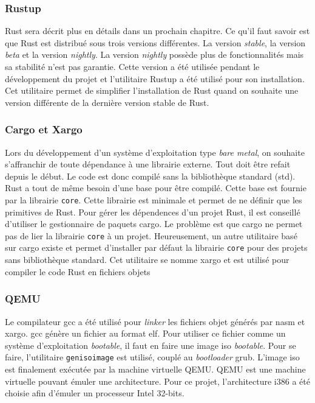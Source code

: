 \documentclass[a4paper, 12pt]{article}
\begin{document}
\subsubsection{Rustup}
Rust sera décrit plus en détails dans un prochain chapitre. Ce qu'il faut savoir
est que Rust est distribué sous trois versions différentes. La version \textit{stable},
la version \textit{beta} et la version \textit{nightly}. La version \textit{nightly}
possède plus de fonctionnalités mais sa stabilité n'est pas garantie. Cette version
a été utilisée pendant le développement du projet et l'utilitaire Rustup a été utilisé
pour son installation. Cet utilitaire permet de simplifier l'installation de Rust
quand on souhaite une version différente de la dernière version stable de Rust. \\

\subsubsection{Cargo et Xargo}
Lors du développement d'un système d'exploitation type \textit{bare metal}, on souhaite
s'affranchir de toute dépendance à une librairie externe. Tout doit être refait depuis
le début. Le code est donc compilé sans la bibliothèque standard (std). Rust a tout
de même besoin d'une base pour être compilé. Cette base est fournie par la librairie
\texttt{core}. Cette librairie est minimale et permet de ne définir que
les primitives de Rust. Pour gérer les dépendences d'un projet Rust, il est conseillé
d'utiliser le gestionnaire de paquets cargo. Le problème est que cargo ne permet
pas de lier la librairie \texttt{core} à un projet. Heureusement, un 
autre utilitaire basé sur cargo existe et permet d'installer par défaut la librairie
\texttt{core} pour des projets sans bibliothèque standard. Cet utilitaire
se nomme xargo et est utilisé pour compiler le code Rust en fichiers objets \\

\subsubsection{QEMU}
Le compilateur \acrshort{gcc} a été utilisé pour \textit{linker} les fichiers
objet générés par nasm et xargo. \acrshort{gcc} génère un fichier au format \acrshort{elf}.
Pour utiliser ce fichier comme un système d'exploitation \textit{bootable}, il faut
en faire une image \acrshort{iso} \textit{bootable}. Pour se faire, l'utilitaire
\texttt{genisoimage} est utilisé, couplé au \textit{bootloader} \acrshort{grub}.
L'image \acrshort{iso} est finalement exécutée par la machine virtuelle QEMU.
QEMU est une machine virtuelle pouvant émuler une architecture. Pour ce projet,
l'architecture i386 a été choisie afin d'émuler un processeur Intel 32-bits.
\end{document}
